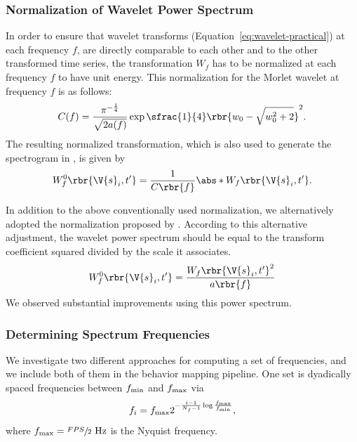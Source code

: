 \subsubsection{Normalization of Wavelet Power Spectrum}
In order to ensure that wavelet transforms (Equation~\ref{eq:wavelet-practical}) at each frequency $f$, are directly comparable to each other and to the other transformed time series, the transformation $W_f$ has to be normalized at each frequency $f$ to have unit energy.
This normalization for the Morlet wavelet at frequency $f$ is as follows:
\begin{equation}
	C(f) = \frac{\pi^{-\frac{1}{4}}}{\sqrt{2a(f)}}\exp{\sfrac{1}{4}\rbr{w_0-\sqrt{w_0^2+2}}^2}.
\end{equation}
The resulting normalized transformation, which is also used to generate the spectrogram in \citet{berman_mapping_2014}, is given by
\begin{equation}
	W^0_f\rbr{\V{s}_i, t^\prime} = \frac{1}{C\rbr{f}} \abs*{W_f\rbr{\V{s}_i, t^\prime}}.
\end{equation}

In addition to the above conventionally used normalization, we alternatively adopted the normalization proposed by \citet{liu_rectification_2007}. According to this alternative adjustment, the wavelet power spectrum should be equal to the transform coefficient squared divided by the scale it associates.
\begin{equation}\label{equation:wavelet-normalization}
	W^{0}_f\rbr{\V{s}_i, t^\prime} = \frac{W_f\rbr{\V{s}_i, t^\prime}^2}{a\rbr{f}}
\end{equation}
We observed substantial improvements using this power spectrum.

\subsubsection{Determining Spectrum Frequencies}
We investigate two different approaches for computing a set of frequencies, and we include both of them in the behavior mapping pipeline.
One set is dyadically spaced frequencies between $f_{\textnormal{min}}$ and $f_{\textnormal{max}}$ via
\begin{equation}\label{equation:dyadically-spaced-spectrum}
	f_i = f_{\textnormal{max}} 2^{-\frac{i-1}{N_f-1}\log{\frac{f_{\textnormal{max}}}{f_{\textnormal{min}}}}},
\end{equation}
where $f_{\textnormal{max}} = \sfrac{FPS}{2} \textnormal{ Hz}$ is the Nyquist frequency.

